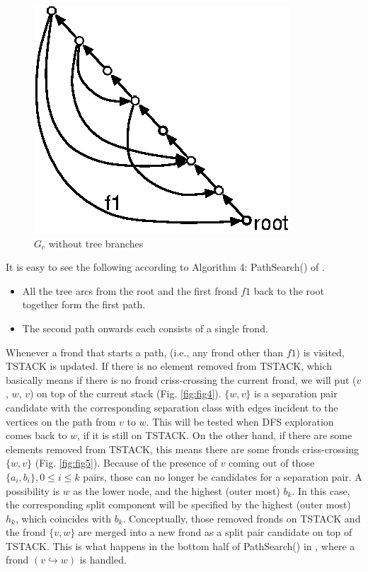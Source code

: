 \documentclass[twoside,twocolumn]{article}
\begin{document}
\begin{figure}[!htb]
\centering
\includegraphics[scale=1.0]{spqr_fig3.eps}
\caption{$G_c$ without tree branches}
\label{fig:fig3}
\end{figure}


It is easy to see the following according to {\ttfamily Algorithm 4: PathSearch()} of
\cite{GM01}.

\begin{itemize}
\item All the tree arcs from the root and the first frond $f1$ back to the root
together form the first path.
\item The second path onwards each consists of a single frond.
\end{itemize}

Whenever a frond that starts a path, (i.e., any frond other than $f1$) is visited,
 {\ttfamily TSTACK} is updated.
If there is no element removed from {\ttfamily TSTACK}, which basically means if there is
no frond criss-crossing the current frond, we will put ($v$, $w$, $v$) on top of the
current stack (Fig. \ref{fig:fig4}).
$\{w,v\}$ is a separation pair candidate with the corresponding separation class with edges
 incident to the vertices on the path from $v$ to $w$. This will be tested when
DFS exploration comes back to $w$, if it is still on {\ttfamily TSTACK}.
On the other hand, if there are some elements removed from {\ttfamily TSTACK},
this means there are some fronds criss-crossing $\{w,v\}$ (Fig. \ref{fig:fig5}).
Because of the presence
of $v$ coming out of those $\{a_i,b_i\}, 0 \leq i \leq k$ pairs, those can no longer be candidates
for a separation pair. A possibility is $w$ as the lower node, and the highest
(outer most) $b_{k}$. In this case, the corresponding split component will be
specified by the highest (outer most) $h_{k}$, which coincides with $b_{k}$.
Conceptually, those removed fronds on {\ttfamily TSTACK} and the frond $\{v,w\}$ are merged
into a new frond as a split pair candidate on top of {\ttfamily TSTACK}.
This is what happens in the bottom half of {\ttfamily PathSearch()} in \cite{GM01}, where
a frond $(v \hookrightarrow w)$ is handled.
\end{document}
